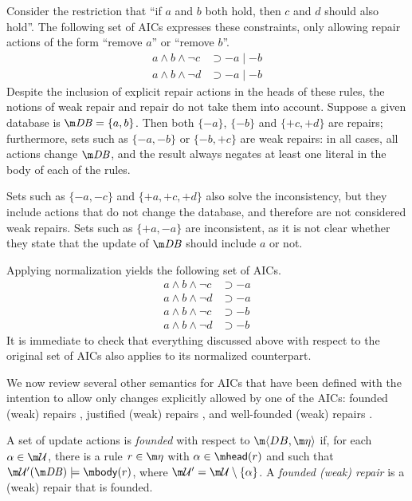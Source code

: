 \begin{example}
  \label{ex:repairs}
  Consider the restriction that ``if $a$ and $b$ both hold, then $c$ and $d$ should also hold''.
  The following set of AICs expresses these constraints, only allowing repair actions of the form ``remove $a$'' or ``remove $b$''.
  \begin{align*}
    a\land b\land\neg c &\supset -a\mid -b\\    
    a\land b\land\neg d &\supset -a\mid -b
  \end{align*}
  Despite the inclusion of explicit repair actions in the heads of these rules, the notions of weak repair and repair do not take them into account.
  Suppose a given database is $\db=\{a,b\}$.
  Then both $\{{-a}\}$, $\{{-b}\}$ and $\{{+c},{+d}\}$ are repairs; furthermore, sets such as $\{{-a},{-b}\}$ or $\{{-b},{+c}\}$ are weak repairs: in all cases, all actions change $\db$, and the result always negates at least one literal in the body of each of the rules.

  Sets such as $\{{-a},{-c}\}$ and $\{{+a},{+c},{+d}\}$ also solve the inconsistency, but they include actions that do not change the database, and therefore are not considered weak repairs.
  Sets such as $\{{+a},{-a}\}$ are inconsistent, as it is not clear whether they state that the update of $\db$ should include $a$ or not.

  Applying normalization yields the following set of AICs.
  \begin{align*}
    a\land b\land\neg c &\supset{-a} \\
    a\land b\land\neg d &\supset{-a} \\
    a\land b\land\neg c &\supset{-b} \\
    a\land b\land\neg d &\supset{-b}
  \end{align*}
  It is immediate to check that everything discussed above with respect to the original set of AICs also applies to its normalized counterpart.
\end{example}

 We now review several other semantics for AICs that have been defined with the intention to allow only changes explicitly allowed by one of the AICs: founded (weak) repairs \cite{iclp/CaropreseGSZ06}, justified (weak) repairs \cite{tplp/CaropreseT11}, and well-founded (weak) repairs \cite{tase/Cruz-FilipeEGN13}.

\begin{definition}
 A set of update actions \UU is \emph{founded} with respect to $\fulldb$ if, for each $\alpha \in \UU$, there is a rule  $r\in \aics$ with $\alpha\in\head(r)$ and such that $\UU'(\db)\models \body(r)$, where $\UU'=\UU\setminus\{\alpha\}$. A \emph{founded (weak) repair} is a (weak) repair that is founded.
\end{definition}

